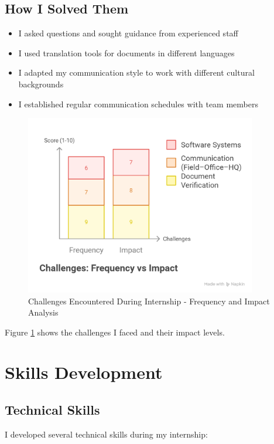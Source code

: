\subsection{How I Solved Them}
\begin{itemize}[leftmargin=*, itemsep=0.25em]
    \item I asked questions and sought guidance from experienced staff
    \item I used translation tools for documents in different languages
    \item I adapted my communication style to work with different cultural backgrounds
    \item I established regular communication schedules with team members
\end{itemize}

\begin{figure}[H]
    \centering
    \includegraphics[width=0.9\textwidth]{assets/images/challenge_analysis_chart.png}
    \caption{Challenges Encountered During Internship - Frequency and Impact Analysis}
    \label{fig:challenge_analysis_chart}
\end{figure}

Figure \ref{fig:challenge_analysis_chart} shows the challenges I faced and their impact levels.

\section{Skills Development}

\subsection{Technical Skills}
I developed several technical skills during my internship:


